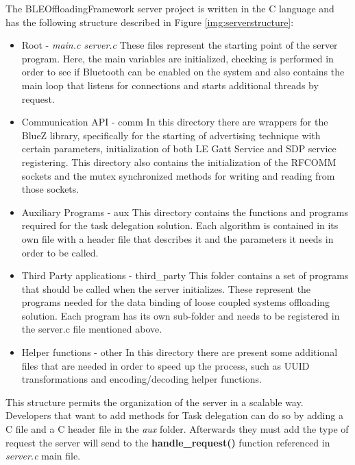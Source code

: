 The BLEOffloadingFramework server project is written in the C language and has the following structure described in Figure \ref{img:serverstructure}:


\begin{itemize}

\item{Root - \textit{main.c server.c}}
	These files represent the starting point of the server program. Here, the main variables are initialized, checking is performed in order to see if Bluetooth can be enabled on the system and also contains the main loop that listens for connections and starts additional threads by request.

\item{Communication API - comm}
	In this directory there are wrappers for the BlueZ library, specifically for the starting of advertising technique with certain parameters, initialization of both LE Gatt Service and SDP service registering. This directory also contains the initialization of the RFCOMM sockets and the mutex synchronized methods for writing and reading from those sockets.

\item{Auxiliary Programs - aux}
	This directory contains the functions and programs required for the task delegation solution. Each algorithm is contained in its own file with a header file that describes it and the parameters it needs in order to be called.
	
\item{Third Party applications - third_party}
	This folder contains a set of programs that should be called when the server initializes. These represent the programs needed for the data binding of loose coupled systems offloading solution. Each program has its own sub-folder and needs to be registered in the server.c file mentioned above.
	
\item{Helper functions - other}
	In this directory there are present some additional files that are needed in order to speed up the process, such as UUID transformations and encoding/decoding helper functions.

\end{itemize}

This structure permits the organization of the server in a scalable way. Developers that want to add methods for Task delegation can do so by adding a C file and a C header file in the \textit{aux} folder. Afterwards they must add the type of request the server will send to the \textbf{handle_request()} function referenced in \textit{server.c} main file. 

